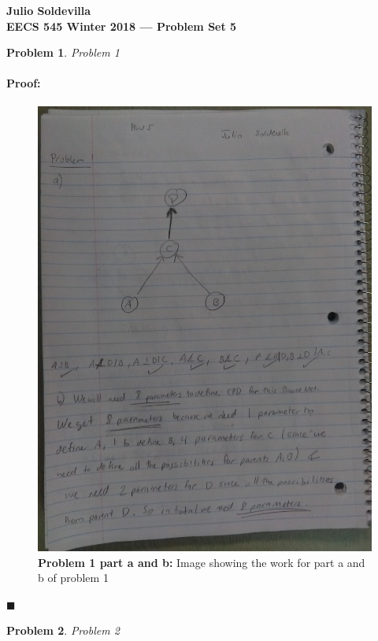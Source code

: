 \documentclass[12pt]{article}
\newenvironment{proof}{\paragraph{Proof: }}{\hfill$\blacksquare$}
\newtheorem{problem}{Problem}%
\begin{document}
\begin{center}
{\bf Julio Soldevilla}
\\
{\bf EECS 545 Winter 2018 --- Problem Set 5 }
\end{center}

\begin{problem}
\normalfont
Problem 1
\end{problem}

\begin{proof}

\begin{figure}[!htbp]
\centering
\includegraphics[width = 13cm]{prob1_hw5.jpg}
\caption{\textbf{Problem 1 part a and b:} Image showing the work for part a and b of problem 1}
\end{figure}

\end{proof}

\newpage
\begin{problem}
\normalfont 
Problem 2
\end{problem}
\end{document}
